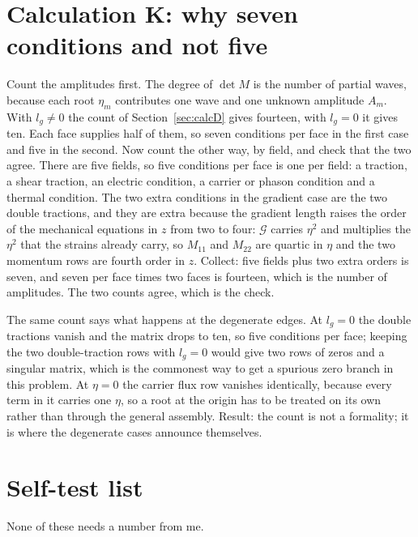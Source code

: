 \documentclass[11pt]{article}
\makeatletter
\newif\ifshowworked
\newenvironment{worked}{%
  \ifshowworked\par\smallskip\noindent\textit{Working.}\par\smallskip\else
  \setbox\z@\vbox\bgroup\fi}{\ifshowworked\par\smallskip\else\egroup\fi}
\newcommand{\Gcal}{\mathcal{G}}
\makeatother
\begin{document}
\section{Calculation K: why seven conditions and not five}

\begin{worked}
Count the amplitudes first. The degree of $\det M$ is the number of partial waves, because each root
$\eta_m$ contributes one wave and one unknown amplitude $A_m$. With $l_g\ne0$ the count of
Section~\ref{sec:calcD} gives fourteen, with $l_g=0$ it gives ten. Each face supplies half of them, so
seven conditions per face in the first case and five in the second.
Now count the other way, by field, and check that the two agree. There are five fields, so five conditions
per face is one per field: a traction, a shear traction, an electric condition, a carrier or phason
condition and a thermal condition. The two extra conditions in the gradient case are the two double
tractions, and they are extra because the gradient length raises the order of the mechanical equations in
$z$ from two to four: $\Gcal$ carries $\eta^2$ and multiplies the $\eta^2$ that the strains already carry,
so $M_{11}$ and $M_{22}$ are quartic in $\eta$ and the two momentum rows are fourth order in $z$.
Collect: five fields plus two extra orders is seven, and seven per face times two faces is fourteen, which
is the number of amplitudes. The two counts agree, which is the check.
\end{worked}

\begin{worked}
The same count says what happens at the degenerate edges. At $l_g=0$ the double tractions vanish and the
matrix drops to ten, so five conditions per face; keeping the two double-traction rows with $l_g=0$ would
give two rows of zeros and a singular matrix, which is the commonest way to get a spurious zero branch in
this problem. At $\eta=0$ the carrier flux row vanishes identically, because every term in it carries one
$\eta$, so a root at the origin has to be treated on its own rather than through the general assembly.
Result: the count is not a formality; it is where the degenerate cases announce themselves.
\end{worked}

\section{Self-test list}\label{sec:selftest}

None of these needs a number from me.
\end{document}
